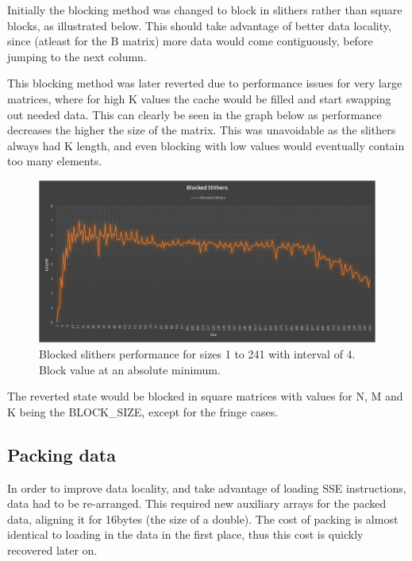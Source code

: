\documentclass[a4paper,11pt,oneside]{book}
\begin{document}
Initially the blocking method was changed to block in slithers rather than square blocks, as illustrated below. This should take advantage of better data locality, since (atleast for the B matrix) more data would come contiguously, before jumping to the next column.


This blocking method was later reverted due to performance issues for very large matrices, where for high K values the cache would be filled and start swapping out needed data. This can clearly be seen in the graph below as performance decreases the higher the size of the matrix. This was unavoidable as the slithers always had K length, and even blocking with low values would eventually contain too many elements.

\begin{figure}
  \centering
  \includegraphics[width=0.9\linewidth]{graph-blocked-downcurve.png}
  \caption{Blocked slithers performance for sizes 1 to 241 with interval of 4. Block value at an absolute minimum.}
  \centering
  \label{fig:sub1}
\end{figure}

The reverted state would be blocked in square matrices with values for N, M and K being the BLOCK\_SIZE, except for the fringe cases.


\subsection{Packing data}
In order to improve data locality, and take advantage of loading SSE instructions, data had to be re-arranged. This required new auxiliary arrays for the packed data, aligning it for 16bytes (the size of a double). The cost of packing is almost identical to loading in the data in the first place, thus this cost is quickly recovered later on.
\end{document}
